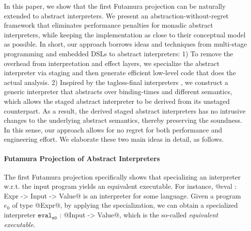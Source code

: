 In this paper, we show that the first Futamura projection can be naturally
extended to abstract interpreters. We present an abstraction-without-regret
framework that eliminates performance penalties for monadic abstract
interpreters, while keeping the implementation as close to their conceptual
model as possible.
In short, our approach borrows ideas and techniques from multi-stage
programming and embedded DSLs to abstract interpreters:  1) To remove the
overhead from interpretation and effect layers, we specialize the abstract
interpreter via staging and then generate efficient low-level code that does
the actual analysis. 2) Inspired by the tagless-final interpreters
\cite{DBLP:journals/jfp/CaretteKS09}, we construct a generic interpreter that
abstracts over binding-times and different semantics, which allows the staged
abstract interpreter to be derived from its unstaged counterpart.
As a result, the derived staged abstract interpreters has no intrusive changes
to the underlying abstract semantics, thereby preserving the soundness.
In this sense, our approach allows for no regret for both performance and
engineering effort. We elaborate these two main ideas in detail, as follows.


\paragraph{Futamura Projection of Abstract Interpreters}

The first Futamura projection specifically shows that specializing an
interpreter w.r.t. the input program yields an equivalent executable. For
instance, @eval : Expr -> Input -> Value@ is an interpreter for some language.
Given a program $e_0$ of type @Expr@, by applying the specialization, we can
obtain a specialized interpreter $\texttt{eval}_{\texttt{e0}}$ :
@Input -> Value@, which is the so-called \textit{equivalent executable}.


